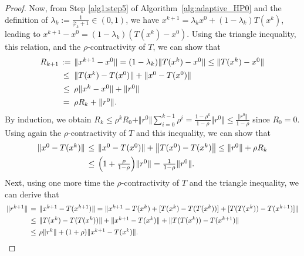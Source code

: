 \documentclass[10pt,a4paper]{amsart}
\newcommand{\norm}[1]{\left\Vert#1\right\Vert}
\newcommand{\norms}[1]{\Vert#1\Vert}
\begin{document}
\begin{proof}
Now, from Step \ref{alg1:step5} of Algorithm~\ref{alg:adaptive_HP0} and the definition of $\lambda_k := \frac{1}{\bar{\varphi}_k + 1} \in (0, 1)$, we have $x^{k+1} = \lambda_kx^0 + (1-\lambda_k)T(x^k)$, leading to $x^{k+1} - x^0 = (1-\lambda_k)(T(x^k) - x^0)$.
Using the triangle inequality, this relation, and the $\rho$-contractivity of $T$, we can show that
\begin{equation*}
\arraycolsep=0.2em
\begin{array}{lcl}
R_{k+1} &:= & \norms{x^{k+1} - x^0} = (1-\lambda_k)\norms{T(x^k) - x^0} \leq \norms{T(x^k) - x^0} \vspace{1ex}\\
& \leq & \norms{T(x^k) - T(x^0)} + \norms{x^0 - T(x^0)} \vspace{1ex}\\
& \leq & \rho\norms{x^k - x^0} + \norms{r^0} \vspace{1ex}\\
& = & \rho R_k + \norms{r^0}.
\end{array}
\end{equation*}
By induction, we obtain $R_k \leq \rho^k R_0 + \norms{r^0}\sum_{i=0}^{k-1}\rho^i = \frac{1-\rho^k}{1-\rho}\norms{r^0} \leq \frac{\norms{r^0}}{1-\rho}$  since $R_0 = 0$.
Using again the $\rho$-contractivity of $T$ and this inequality, we can show that
\begin{equation}\label{eq:th21_proof1}
\arraycolsep=0.2em
\begin{array}{lcl}
\norms{x^0 - T(x^k)} & \leq & \norms{x^0 - T(x^0)} + \norm{T(x^0) - T(x^k)} \leq \norms{r^0} + \rho R_k \vspace{1ex}\\
& \leq & \Big(1 + \frac{\rho}{1-\rho}\Big)\norms{r^0} = \frac{1}{1-\rho}\norms{r^0}.
\end{array}
\end{equation}
Next, using one more time the $\rho$-contractivity of $T$ and the triangle inequality, we can derive that
\begin{equation}\label{eq:th21_proof2} 
\arraycolsep=0.2em
\begin{array}{lcl}
\norms{r^{k+1}} & = & \norms{x^{k+1} - T(x^{k+1})} = \norms{x^{k+1} - T(x^k) + [T(x^k) - T(T(x^k))] + [T(T(x^k)) - T(x^{k+1})]} \vspace{1ex}\\
& \leq & \norms{T(x^k) - T(T(x^k))} + \norms{x^{k+1} - T(x^k)} +  \norms{T(T(x^k)) - T(x^{k+1})} \vspace{1ex}\\
& \leq & \rho\norms{r^k} +  (1 + \rho)\norms{x^{k+1} - T(x^k)}.

\end{array}
\end{equation}
\end{proof}
\end{document}
